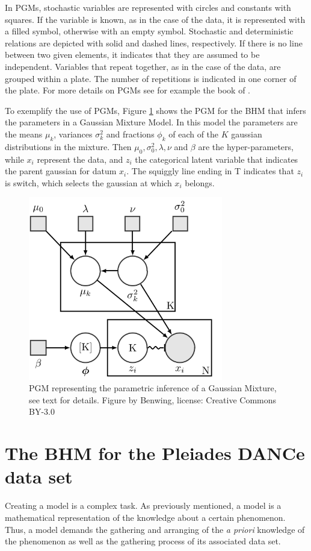 In PGMs, stochastic variables are represented with circles and constants with squares. If the variable is known, as in the case of the data, it is represented with a filled symbol, otherwise with an empty symbol. Stochastic and deterministic relations are depicted with solid and dashed lines, respectively. If there is no line between two given elements, it indicates that they are assumed to be independent. Variables that repeat together, as in the case of the data, are grouped within a plate. The number of repetitions is indicated in one corner of the plate. For more details on PGMs see for example the book of \citet{Koller2009}. 

To exemplify the use of PGMs, Figure \ref{fig:pgmGMM} shows the PGM for the BHM that infers the parameters in a Gaussian Mixture Model. In this model the parameters are the means $\mu_k$, variances $\sigma_k^2$ and fractions $\phi_k$ of each of the $K$ gaussian distributions in the mixture. Then $\mu_0,\sigma_0^2,\lambda,\nu$ and $\beta$ are the hyper-parameters, while $x_i$ represent the data, and $z_i$ the categorical latent variable that indicates the parent gaussian for datum $x_i$. The squiggly line ending in T indicates that $z_i$ is switch, which selects the gaussian at which $x_i$ belongs.

\begin{figure}[ht!]
\begin{center}
\includegraphics[height=8cm]{background/Figures/BGMM.png}
\caption{PGM representing the parametric inference of a Gaussian Mixture, see text for details. Figure by Benwing, license: Creative Commons BY-3.0}
\label{fig:pgmGMM}
\end{center}
\end{figure}

\section{The BHM for the Pleiades DANCe data set}
\label{sect:datamodelling}
Creating a model is a complex task. As previously mentioned, a model is a mathematical representation of the knowledge about a certain phenomenon. Thus, a model demands the gathering and arranging of the \emph{a priori} knowledge of the phenomenon as well as the gathering process of its associated data set. 

